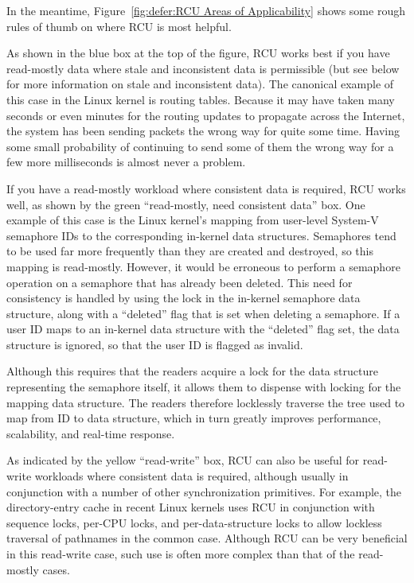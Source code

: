 In the meantime,
Figure~\ref{fig:defer:RCU Areas of Applicability}
shows some rough rules of thumb on where RCU is most helpful.

As shown in the blue box at the top of the figure, RCU works best if
you have read-mostly data where stale and inconsistent
data is permissible (but see below for more information on stale and
inconsistent data).
The canonical example of this case in the Linux kernel is routing tables.
Because it may have taken many seconds or even minutes for the
routing updates to propagate across the Internet, the system
has been sending packets the wrong way for quite some time.
Having some small probability of continuing to send some of them the wrong
way for a few more milliseconds is almost never a problem.

If you have a read-mostly workload where consistent data is required,
RCU works well, as shown by the green ``read-mostly, need consistent data''
box.
One example of this case is the Linux kernel's mapping from user-level
System-V semaphore IDs to the corresponding in-kernel data structures.
Semaphores tend to be used far more frequently than they are created
and destroyed, so this mapping is read-mostly.
However, it would be erroneous to perform a semaphore operation on
a semaphore that has already been deleted.
This need for consistency is handled by using the lock in the
in-kernel semaphore data structure, along with a ``deleted''
flag that is set when deleting a semaphore.
If a user ID maps to an in-kernel data structure with the
``deleted'' flag set, the data structure is ignored, so that
the user ID is flagged as invalid.

Although this requires that the readers acquire a lock for the
data structure representing the semaphore itself,
it allows them to dispense with locking for the
mapping data structure.
The readers therefore locklessly
traverse the tree used to map from ID to data structure,
which in turn greatly improves performance, scalability, and
real-time response.

As indicated by the yellow ``read-write'' box, RCU can also be useful
for read-write
workloads where consistent data is required, although usually in
conjunction with a number of other synchronization primitives.
For example, the directory-entry cache in recent Linux kernels uses RCU in
conjunction with sequence locks, per-CPU locks, and per-data-structure
locks to allow lockless traversal of pathnames in the common case.
Although RCU can be very beneficial in this read-write case, such
use is often more complex than that of the read-mostly cases.

